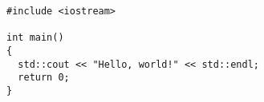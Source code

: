 \documentclass{article}
\begin{document}
\begin{cppcode}
  \begin{Verbatim}
#include <iostream>

int main()
{
  std::cout << "Hello, world!" << std::endl;
  return 0;
}
  \end{Verbatim}
\end{cppcode}
\end{document}
